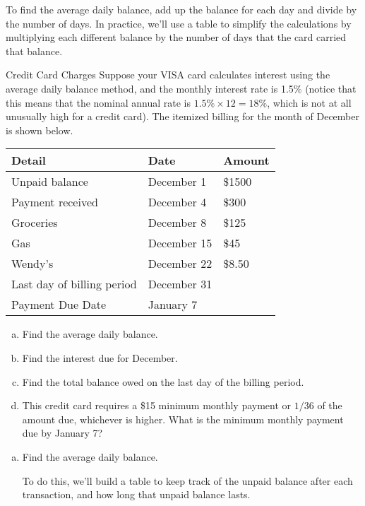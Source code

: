 To find the average daily balance, add up the balance for each day and divide by the number of days.  In practice, we'll use a table to simplify the calculations by multiplying each different balance by the number of days that the card carried that balance.

\begin{example}[https://www.youtube.com/watch?v=ZUEQu_e2TqY]{Credit Card Charges}
Suppose your VISA card calculates interest using the average daily balance method, and the monthly interest rate is 1.5\% (notice that this means that the nominal annual rate is $1.5\% \times 12 = 18\%$, which is not at all unusually high for a credit card).  The itemized billing for the month of December is shown below.
\begin{center}
\begin{tabular}{l l l}
Detail & Date & Amount\\
\hline
Unpaid balance & December 1 & \$1500\\
Payment received & December 4 & \$300\\
Groceries & December 8 & \$125\\
Gas & December 15 & \$45\\
Wendy's & December 22 & \$8.50\\
Last day of billing period & December 31 &\\
Payment Due Date & January 7 &\\
\end{tabular}
\end{center}

\begin{enumerate}[(a)]
\item Find the average daily balance.
\item Find the interest due for December.
\item Find the total balance owed on the last day of the billing period.
\item This credit card requires a \$15 minimum monthly payment or $1/36$ of the amount due, whichever is higher.  What is the minimum monthly payment due by January 7?
\end{enumerate}

\sol
\begin{enumerate}[(a)]
\item Find the average daily balance.

To do this, we'll build a table to keep track of the unpaid balance after each transaction, and how long that unpaid balance lasts.


\end{enumerate}
\end{example}
